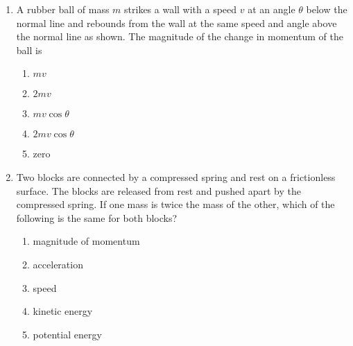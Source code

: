 \documentclass{../../../oss-classkick}
\begin{document}
\begin{multicols}{2}
\begin{enumerate}[leftmargin=18pt]
  \item A rubber ball of mass $m$ strikes a wall with a speed $v$ at an angle
    $\theta$ below the normal line and rebounds from the wall at the same speed
    and angle above the normal line as shown. The magnitude of the change in
    momentum of the ball is
    \begin{center}
    \end{center}
    \begin{enumerate}[nosep,leftmargin=18pt,label=(\Alph*)]
    \item $mv$
    \item $2mv$
    \item $mv\cos\theta$
    \item $2mv\cos\theta$
    \item  zero
    \end{enumerate}
    
  \item Two blocks are connected by a compressed spring and rest on a
    frictionless surface. The blocks are released from rest and pushed apart
    by the compressed spring. If one mass is twice the mass of the other,
    which of the following is the same for both blocks?
    \begin{enumerate}[nosep,leftmargin=18pt,label=(\Alph*)]
    \item magnitude of momentum
    \item acceleration
    \item speed
    \item kinetic energy
    \item potential energy
    \end{enumerate}
    \vspace{.7in}
    \columnbreak
    

\end{enumerate}
\end{multicols}
\end{document}
